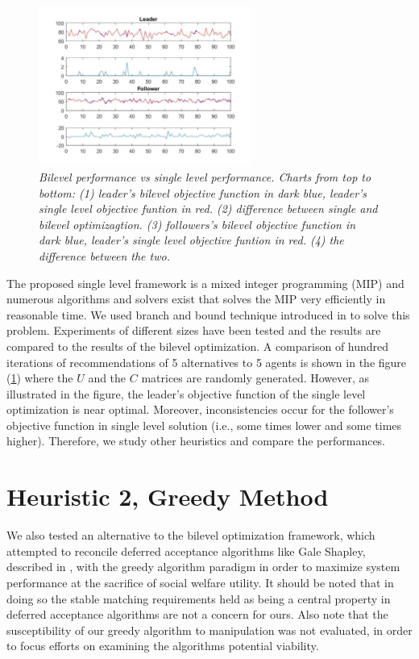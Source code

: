 \documentclass[11pt, letterpaper]{article}
\begin{document}
\begin{figure}[h!]
\centering
\includegraphics[width=0.62\textwidth]{comparison.png}
\caption{\emph{Bilevel performance vs single level performance. Charts from top to bottom: (1) leader's bilevel objective function in dark blue, leader's single level objective funtion in red. (2) difference between single and bilevel optimizagtion. (3) followers's bilevel objective function in dark blue, leader's single level objective funtion in red. (4) the difference between the two. }}   
\label{fig:comparision}
\end{figure}
\vspace{0.5in}
The proposed single level framework is a mixed integer programming (MIP) and numerous algorithms and solvers exist that solves the MIP very efficiently in reasonable time. We used branch and bound technique introduced in \cite{fourer1993ampl} to solve this problem. Experiments of different sizes have been tested and the results are compared to the results of the bilevel optimization. A comparison of hundred iterations of recommendations of 5 alternatives to 5 agents is shown in the figure (\ref{fig:comparision}) where the $U$ and the $C$ matrices are randomly generated. However, as illustrated in the figure, the leader's objective function of the single level optimization is near optimal. Moreover, inconsistencies occur for the follower's objective function in single level solution (i.e., some times lower and some times higher). Therefore, we study other heuristics and compare the performances. 

\section{Heuristic 2, Greedy Method}
We also tested an alternative to the bilevel optimization framework, which attempted to reconcile deferred acceptance algorithms like Gale Shapley, described in \cite{gale1962college}, with the greedy algorithm paradigm in order to maximize system performance at the sacrifice of social welfare utility.  It should be noted that in doing so the stable matching requirements held as being a central property in deferred acceptance algorithms are not a concern for ours.  Also note that the susceptibility of our greedy algorithm to manipulation was not evaluated, in order to focus efforts on examining the algorithms potential viability.  
\end{document}
